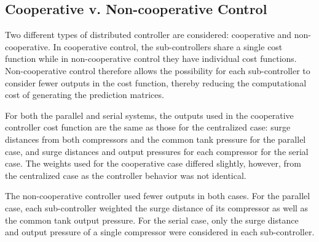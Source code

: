 \subsection{Cooperative v. Non-cooperative Control}
Two different types of distributed controller are considered: cooperative and non-cooperative. 
In cooperative control, the sub-controllers share a single cost function while in non-cooperative control they have individual cost functions. 
Non-cooperative control therefore allows the possibility for each sub-controller to consider fewer outputs in the cost function, thereby reducing the computational cost of generating the prediction matrices.

For both the parallel and serial systems, the outputs used in the cooperative controller cost function are the same as those for the centralized case: surge distances from both compressors and the common tank pressure for the parallel case, and surge distances and output pressures for each compressor for the serial case. 
The weights used for the cooperative case differed slightly, however, from the centralized case as the controller behavior was not identical.

The non-cooperative controller used fewer outputs in both cases. 
For the parallel case, each sub-controller weighted the surge distance of its compressor as well as the common tank output pressure.
For the serial case, only the surge distance and output pressure of a single compressor were considered in each sub-controller. 

